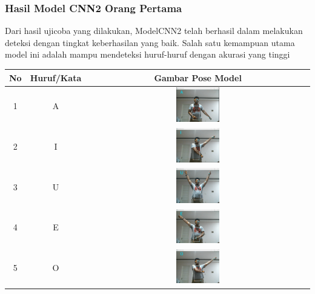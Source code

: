 \subsubsection*{Hasil Model CNN2 Orang Pertama}

Dari hasil ujicoba yang dilakukan, ModelCNN2 telah berhasil dalam melakukan deteksi dengan tingkat keberhasilan yang baik. Salah satu kemampuan utama model ini adalah mampu mendeteksi huruf-huruf dengan akurasi yang tinggi

\begin{table}[!hbt]
	\centering
	\label{tbl:Tabel Contoh Huruf/Kata dan Gambar Pose Model CNN2 Orang Pertama}
	\begin{tabular}{|c|c|c|}
	\hline
	No & Huruf/Kata & Gambar Pose Model  \\
	\hline
	1 & A & \includegraphics[width=0.2\textwidth]{gambar/bener/HurufA_ModelCNN2_Dawe.png} \\
	\hline
	2 & I & \includegraphics[width=0.2\textwidth]{gambar/bener/HurufI_ModelCNN2_Dawe.png} \\
	\hline
	3 & U & \includegraphics[width=0.2\textwidth]{gambar/bener/HurufU_ModelCNN2_Dawe.png} \\
	\hline
	4 & E & \includegraphics[width=0.2\textwidth]{gambar/bener/HurufE_ModelCNN2_Dawe.png} \\
	\hline
	5 & O & \includegraphics[width=0.2\textwidth]{gambar/bener/HurufO_ModelCNN2_Dawe.png} \\

\end{tabular}
\end{table}
